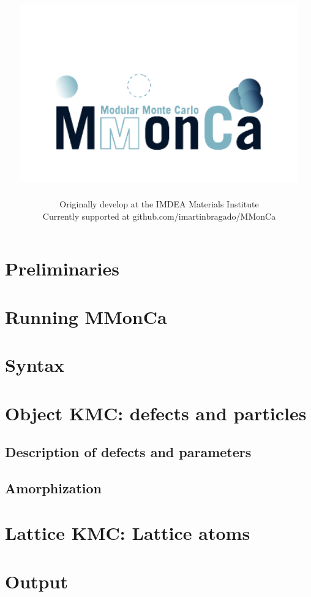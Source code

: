 \documentclass[a4paper]{book}
\author{Originally develop at the IMDEA Materials Institute\\
Currently supported at github.com/imartinbragado/MMonCa}
\title{\includegraphics[width=12cm]{images/logo}}
\begin{document}
\maketitle
\tableofcontents


\newpage
\chapter{Preliminaries}





\chapter{Running MMonCa}




\chapter{Syntax}


\chapter{Object KMC: defects and particles}



\section{Description of defects and parameters}





\section{Amorphization}


\chapter{Lattice KMC: Lattice atoms}


\chapter{Output}



\end{document}
